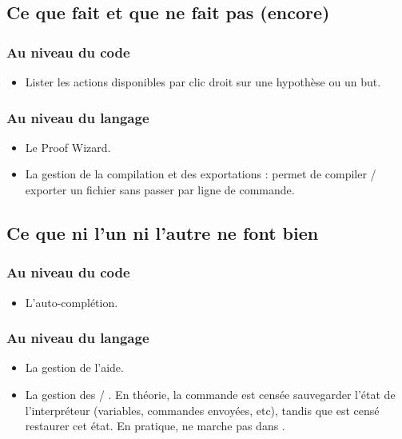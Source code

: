     \subsection{Ce que \coqide{} fait et que \coquille{} ne fait pas (encore)}
    
        \subsubsection{Au niveau du code}

            \begin{itemize}
                \item Lister les actions disponibles par clic droit sur une hypothèse ou un but.
            \end{itemize}

        \subsubsection{Au niveau du langage}
        
            \begin{itemize}
                \item Le Proof Wizard.
                \item La gestion de la compilation et des exportations : \coqide{} permet de compiler / exporter un fichier sans passer par ligne de commande.
            \end{itemize}

    \subsection{Ce que ni l'un ni l'autre ne font bien}

        \subsubsection{Au niveau du code}

            \begin{itemize}
                \item L'auto-complétion.
            \end{itemize}

        \subsubsection{Au niveau du langage}
        
            \begin{itemize}
                \item La gestion de l'aide.
                \item La gestion des  / .
                En théorie, la commande  est censée sauvegarder l'état de l'interpréteur (variables, commandes envoyées, etc), tandis que  est censé restaurer cet état.
			    En pratique,  ne marche pas dans \coqtop{}.
            \end{itemize}

